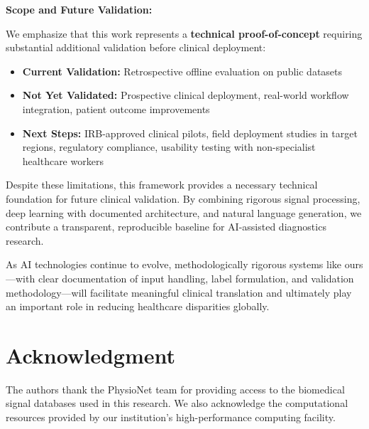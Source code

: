 \documentclass[conference]{IEEEtran}
\begin{document}
\textbf{Scope and Future Validation:}

We emphasize that this work represents a \textbf{technical proof-of-concept} requiring substantial additional validation before clinical deployment:
\begin{itemize}
\item \textbf{Current Validation:} Retrospective offline evaluation on public datasets
\item \textbf{Not Yet Validated:} Prospective clinical deployment, real-world workflow integration, patient outcome improvements
\item \textbf{Next Steps:} IRB-approved clinical pilots, field deployment studies in target regions, regulatory compliance, usability testing with non-specialist healthcare workers
\end{itemize}

Despite these limitations, this framework provides a necessary technical foundation for future clinical validation. By combining rigorous signal processing, deep learning with documented architecture, and natural language generation, we contribute a transparent, reproducible baseline for AI-assisted diagnostics research.

As AI technologies continue to evolve, methodologically rigorous systems like ours—with clear documentation of input handling, label formulation, and validation methodology—will facilitate meaningful clinical translation and ultimately play an important role in reducing healthcare disparities globally.

\section*{Acknowledgment}

The authors thank the PhysioNet team for providing access to the biomedical signal databases used in this research. We also acknowledge the computational resources provided by our institution's high-performance computing facility.
\end{document}
